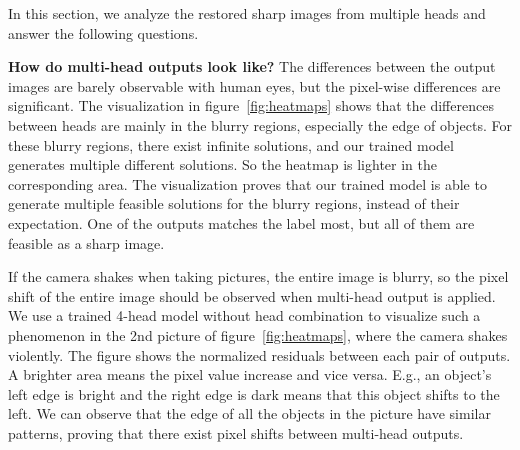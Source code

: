 \documentclass[letterpaper]{article} \usepackage{aaai23}  \usepackage{times}  \usepackage{helvet}  \usepackage{courier}  \usepackage[hyphens]{url}  \usepackage{graphicx} \urlstyle{rm} \def\UrlFont{\rm}  \usepackage{natbib}  \usepackage{caption} \frenchspacing  \setlength{\pdfpagewidth}{8.5in} \setlength{\pdfpageheight}{11in} \usepackage{algorithm}
\begin{document}
In this section, we analyze the restored sharp images from multiple heads and answer the following questions. 

\textbf{How do multi-head outputs look like?} The differences between the output images are barely observable with human eyes, but the pixel-wise differences are significant. The visualization in figure~\ref{fig:heatmaps} shows that the differences between heads are mainly in the blurry regions, especially the edge of objects. For these blurry regions, there exist infinite solutions, and our trained model generates multiple different solutions. So the heatmap is lighter in the corresponding area. The visualization proves that our trained model is able to generate multiple feasible solutions for the blurry regions, instead of their expectation. One of the outputs matches the label most, but all of them are feasible as a sharp image.

If the camera shakes when taking pictures, the entire image is blurry, so the pixel shift of the entire image should be observed when multi-head output is applied. We use a trained 4-head model without head combination to visualize such a phenomenon in the 2nd picture of figure~\ref{fig:heatmaps}, where the camera shakes violently. The figure shows the normalized residuals between each pair of outputs. A brighter area means the pixel value increase and vice versa. E.g., an object's left edge is bright and the right edge is dark means that this object shifts to the left. We can observe that the edge of all the objects in the picture have similar patterns, proving that there exist pixel shifts between multi-head outputs.
\end{document}
